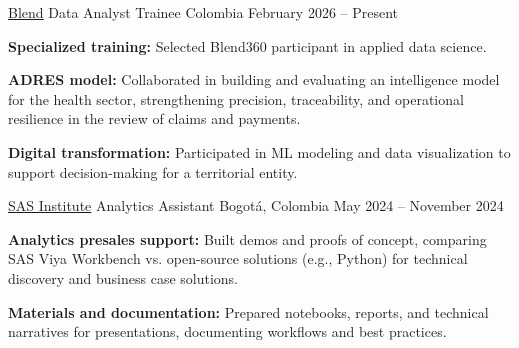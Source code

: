 
\begin{cventries}

  \cventry
    {\href{https://www.blend360.com/}{Blend}} %
    {Data Analyst Trainee} %
    {Colombia} %
    {February 2026 -- Present} %
    {
      \begin{cvitems}
        \item {\textbf{Specialized training:} Selected Blend360 participant in applied data science.}
        \item {\textbf{ADRES model:} Collaborated in building and evaluating an intelligence model for the health sector, strengthening precision, traceability, and operational resilience in the review of claims and payments.}
        \item {\textbf{Digital transformation:} Participated in ML modeling and data visualization to support decision-making for a territorial entity.}
      \end{cvitems}
      \vspace{0.3em}
    }

  \vspace{0.6em}

  \cventry
    {\href{https://www.sas.com/en_us/home.html}{SAS Institute}} %
    {Analytics Assistant} %
    {Bogotá, Colombia} %
    {May 2024 -- November 2024} %
    {
      \begin{cvitems}
        \item {\textbf{Analytics presales support:} Built demos and proofs of concept, comparing SAS Viya Workbench vs. open-source solutions (e.g., Python) for technical discovery and business case solutions.}
        \item {\textbf{Materials and documentation:} Prepared notebooks, reports, and technical narratives for presentations, documenting workflows and best practices.}
      \end{cvitems}
      \vspace{0.3em}
    }


\end{cventries}
